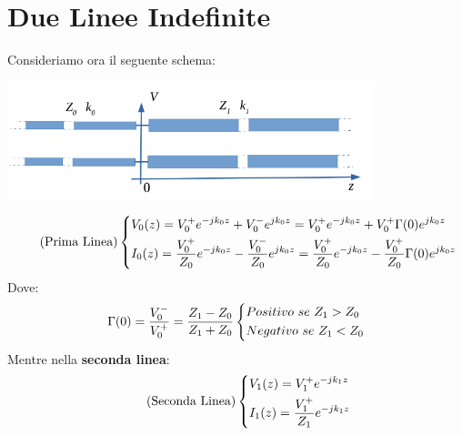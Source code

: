 \section{Due Linee Indefinite}
Consideriamo ora il seguente schema:
\begin{center}
    \includegraphics[width=0.8\textwidth]{Images/Figure14.png}
\end{center}
\begin{equation*}
\tag{Prima Linea}
\begin{dcases}
    V_0(z) = V_0^+ e^{-jk_0z} +  V_0^- e^{jk_0z} = V_0^+ e^{-jk_0z} + V_0^+ \Gamma(0) e^{jk_0z} \\
    I_0(z) = \frac{V_0^+}{Z_0} e^{-jk_0z} - \frac{V_0^-}{Z_0} e^{jk_0z} = \frac{V_0^+}{Z_0} e^{-jk_0z} - \frac{V_0^+}{Z_0}  \Gamma(0) e^{jk_0z}
\end{dcases}
\end{equation*}
Dove:
\begin{equation*}
    \Gamma(0) = \frac{V_0^-}{V_0^+} = \frac{Z_1 - Z_0}{Z_1 + Z_0} 
    \begin{dcases}
    Positivo \ se \ Z_1 > Z_0 \\
    Negativo \ se \ Z_1 < Z_0
    \end{dcases}
\end{equation*}
Mentre nella \textbf{seconda linea}:
\begin{equation*}
\tag{Seconda Linea}
\begin{dcases}
    V_1(z) = V_1^+ e^{-jk_1z}\\
    I_1(z) = \frac{V_1^+}{Z_1} e^{-jk_1z} 
\end{dcases}
\end{equation*}

